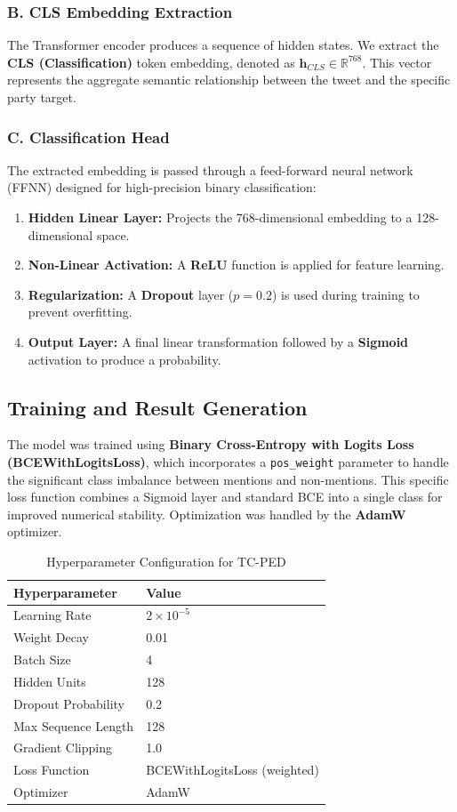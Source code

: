 \documentclass[12pt,a4paper]{article}
\begin{document}
\subsubsection{B. CLS Embedding Extraction}
The Transformer encoder produces a sequence of hidden states. We extract the \textbf{CLS (Classification)} token embedding, denoted as $\mathbf{h}_{CLS} \in \mathbb{R}^{768}$. This vector represents the aggregate semantic relationship between the tweet and the specific party target.

\subsubsection{C. Classification Head}
The extracted embedding is passed through a feed-forward neural network (FFNN) designed for high-precision binary classification:
\begin{enumerate}
    \item \textbf{Hidden Linear Layer:} Projects the 768-dimensional embedding to a 128-dimensional space.
    \item \textbf{Non-Linear Activation:} A \textbf{ReLU} function is applied for feature learning.
    \item \textbf{Regularization:} A \textbf{Dropout} layer ($p=0.2$) is used during training to prevent overfitting.
    \item \textbf{Output Layer:} A final linear transformation followed by a \textbf{Sigmoid} activation to produce a probability.
\end{enumerate}

\subsection{Training and Result Generation}
The model was trained using \textbf{Binary Cross-Entropy with Logits Loss (BCEWithLogitsLoss)}, which incorporates a \texttt{pos\_weight} parameter to handle the significant class imbalance between mentions and non-mentions. This specific loss function combines a Sigmoid layer and standard BCE into a single class for improved numerical stability. Optimization was handled by the \textbf{AdamW} optimizer.

\begin{table}[H]
\centering
\begin{tabular}{@{}ll@{}}
\toprule
\textbf{Hyperparameter} & \textbf{Value} \\ \midrule
Learning Rate & $2 \times 10^{-5}$ \\
Weight Decay & 0.01 \\
Batch Size & 4 \\
Hidden Units & 128 \\
Dropout Probability & 0.2 \\
Max Sequence Length & 128 \\
Gradient Clipping & 1.0 \\ 
Loss Function & BCEWithLogitsLoss (weighted) \\
Optimizer & AdamW \\ \bottomrule
\end{tabular}
\caption{Hyperparameter Configuration for TC-PED}
\end{table}
\end{document}
